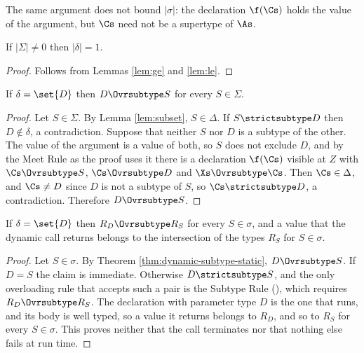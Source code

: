 The same argument does not bound $|\sigma|$: the declaration $\f(\Cs)$ holds the
value of the argument, but $\Cs$ need not be a supertype of $\As$.

\begin{theorem}
\label{thm:overloading-subtyping}
If $|\Sigma| \neq 0$ then $|\delta| = 1$.
\end{theorem}

\begin{proof}
Follows from Lemmas \ref{lem:ge} and \ref{lem:le}.
\end{proof}

\begin{theorem}
\label{thm:dynamic-subtype-static}
If $\delta = \set{D}$ then $D \Ovrsubtype S$ for every $S \in \Sigma$.
\end{theorem}

\begin{proof}
Let $S \in \Sigma$.  By Lemma \ref{lem:subset}, $S \in \Delta$.
If $S \strictsubtype D$ then $D \notin \delta$, a contradiction.
Suppose that neither $S$ nor $D$ is a subtype of the other.
The value of the argument is a value of both, so $S$ does not exclude $D$, and
by the Meet Rule as the proof uses it there is a declaration $\f(\Cs)$ visible
at $Z$ with $\Cs \Ovrsubtype S$, $\Cs \Ovrsubtype D$ and $\Xs \Ovrsubtype \Cs$.
Then $\Cs \in \Delta$, and $\Cs \neq D$ since $D$ is not a subtype of $S$, so
$\Cs \strictsubtype D$, a contradiction.
Therefore $D \Ovrsubtype S$.
\end{proof}

\begin{theorem}
\label{thm:result-type}
If $\delta = \set{D}$ then $R_D \Ovrsubtype R_S$ for every $S \in \sigma$, and a
value that the dynamic call returns belongs to the intersection of the types
$R_S$ for $S \in \sigma$.
\end{theorem}

\begin{proof}
Let $S \in \sigma$.  By Theorem \ref{thm:dynamic-subtype-static},
$D \Ovrsubtype S$.  If $D = S$ the claim is immediate.
Otherwise $D \strictsubtype S$, and the only overloading rule that accepts such
a pair is the Subtype Rule (), which requires
$R_D \Ovrsubtype R_S$.
The declaration with parameter type $D$ is the one that runs, and its body is
well typed, so a value it returns belongs to $R_D$, and so to $R_S$ for every
$S \in \sigma$.
This proves neither that the call terminates nor that nothing else fails at
run time.
\end{proof}
